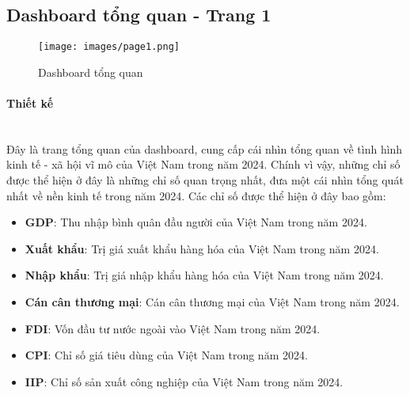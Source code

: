 \documentclass[a4paper]{report}
\begin{document}
{{\subsection{Dashboard tổng quan - Trang 1}

\begin{figure}[H]
    \centering
    \texttt{[image: images/page1.png]}
    \caption{Dashboard tổng quan}
\end{figure}

\paragraph{Thiết kế} \mbox{}\\

Đây là trang tổng quan của dashboard, cung cấp cái nhìn tổng quan về tình hình kinh tế - xã hội vĩ mô của Việt Nam trong năm 2024. Chính vì vậy, những chỉ số được thể hiện ở đây là những chỉ số quan trọng nhất, đưa một cái nhìn tổng quát nhất về nền kinh tế trong năm 2024. Các chỉ số được thể hiện ở đây bao gồm:
\begin{itemize}
    \item \textbf{GDP}: Thu nhập bình quân đầu người của Việt Nam trong năm 2024.
    \item \textbf{Xuất khẩu}: Trị giá xuất khẩu hàng hóa của Việt Nam trong năm 2024.
    \item \textbf{Nhập khẩu}: Trị giá nhập khẩu hàng hóa của Việt Nam trong năm 2024.
    \item \textbf{Cán cân thương mại}: Cán cân thương mại của Việt Nam trong năm 2024.
    \item \textbf{FDI}: Vốn đầu tư nước ngoài vào Việt Nam trong năm 2024.
    \item \textbf{CPI}: Chỉ số giá tiêu dùng của Việt Nam trong năm 2024.
    \item \textbf{IIP}: Chỉ số sản xuất công nghiệp của Việt Nam trong năm 2024.
\end{itemize}

}}
\end{document}
